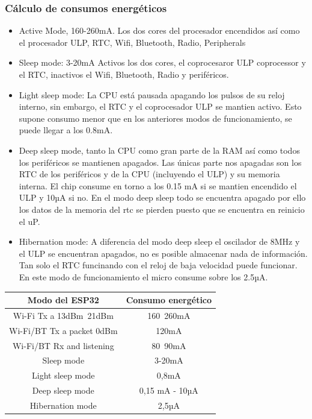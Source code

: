 \documentclass[a4paper ,12pt, onecolumn]{article}
\begin{document}
        \subsubsection{Cálculo de consumos energéticos}
            \begin{itemize}
                \item  Active Mode, 160-260mA.  Los dos cores del procesador encendidos así como el procesador ULP,
                RTC, Wifi, Bluetooth, Radio, Peripherals
                \item  Sleep mode: 3-20mA Activos los dos cores, el coprocesaror ULP coprocessor y el RTC, inactivos el 
                Wifi, Bluetooth, Radio y periféricos.
                \item  Light sleep mode: La CPU está pausada apagando los pulsos de su reloj interno, sin embargo, el RTC
                y el coprocesador ULP se mantien activo. Esto supone consumo menor que en los anteriores modos de funcionamiento,
                se puede llegar a los 0.8mA.
                \item Deep sleep mode, tanto la CPU como gran parte de la RAM así como todos los periféricos se mantienen 
                apagados. Las únicas parte nos apagadas son los RTC de los periféricos y de la CPU (incluyendo el ULP) y su
                memoria interna. El chip consume en torno a los 0.15 mA si se mantien encendido el ULP y  10µA si no.
                En el modo deep sleep todo se encuentra apagado por ello los datos de la memoria del rtc se pierden
                puesto que se encuentra en reinicio el uP.
                \item Hibernation mode: A diferencia del modo deep sleep el oscilador de 8MHz y el ULP se encuentran apagados,
                no es posible almacenar nada de información. Tan solo el RTC funcinando con el reloj de baja velocidad puede funcionar.
                En este modo de funcionamiento el micro consume sobre los 2.5µA.
            \end{itemize}
            \begin{center}
                \begin{tabular}{||c || c ||} 
                \hline
                Modo del ESP32  & Consumo energético  \\ [0.5ex] 
                \hline
                Wi-Fi Tx a 13dBm~21dBm & 160~260mA  \\ 
                Wi-Fi/BT Tx  a packet 0dBm	 & 120mA  \\
                Wi-Fi/BT Rx and listening & 80~90mA  \\
                Sleep mode &  3-20mA   \\
                Light sleep mode &0,8mA  \\
                Deep sleep mode &   0,15 mA - 10µA  \\
                Hibernation mode & 2,5µA  \\
                \end{tabular}
            \end{center}
\end{document}
